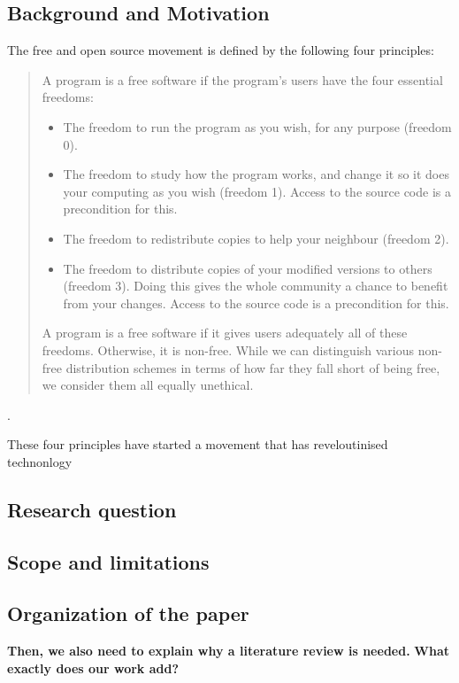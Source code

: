 \documentclass[final-report.tex]{subfiles}
\begin{document}
\subsection{Background and Motivation}
The free and open source movement is defined by the following four principles:
\begin{quote}
    A program is a free software if the program’s users have the four essential freedoms:

    \begin{itemize}
        \item The freedom to run the program as you wish, for any purpose (freedom 0).
        \item The freedom to study how the program works, and change it so it does your computing as you wish (freedom 1). 
            Access to the source code is a precondition for this.
        \item The freedom to redistribute copies to help your neighbour (freedom 2).
        \item The freedom to distribute copies of your modified versions to others (freedom 3). 
            Doing this gives the whole community a chance to benefit from your changes. Access to the source code is a precondition for this.
    \end{itemize}
    A program is a free software if it gives users adequately all of these freedoms. Otherwise, it is non-free. 
    While we can distinguish various non-free distribution schemes in terms of how far they fall short of being free, we consider them all equally unethical.
\end{quote} \cite{b0_stallman}.

These four principles have started a movement that has reveloutinised technonlogy


\subsection{Research question}
\subsection{Scope and limitations}
\subsection{Organization of the paper}
\textbf{Then, we also need to explain why a literature review is needed.}
\textbf{What exactly does our work add?}
\end{document}
